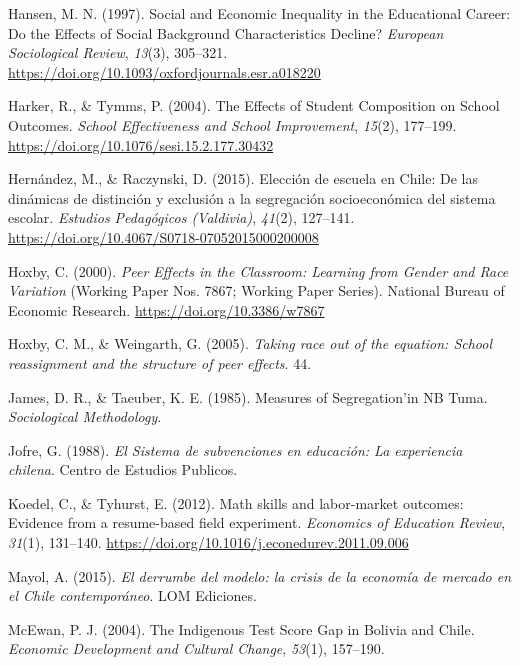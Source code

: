 \documentclass[
]{article}
\begin{document}
\leavevmode\hypertarget{ref-hansen_social_1997}{}%
Hansen, M. N. (1997). Social and Economic Inequality in the Educational
Career: Do the Effects of Social Background Characteristics Decline?
\emph{European Sociological Review}, \emph{13}(3), 305--321.
\url{https://doi.org/10.1093/oxfordjournals.esr.a018220}

\leavevmode\hypertarget{ref-harker_effects_2004}{}%
Harker, R., \& Tymms, P. (2004). The Effects of Student Composition on
School Outcomes. \emph{School Effectiveness and School Improvement},
\emph{15}(2), 177--199.
\url{https://doi.org/10.1076/sesi.15.2.177.30432}

\leavevmode\hypertarget{ref-hernandez_eleccion_2015}{}%
Hernández, M., \& Raczynski, D. (2015). Elección de escuela en Chile: De
las dinámicas de distinción y exclusión a la segregación socioeconómica
del sistema escolar. \emph{Estudios Pedagógicos (Valdivia)},
\emph{41}(2), 127--141.
\url{https://doi.org/10.4067/S0718-07052015000200008}

\leavevmode\hypertarget{ref-hoxby_peer_2000}{}%
Hoxby, C. (2000). \emph{Peer Effects in the Classroom: Learning from
Gender and Race Variation} (Working Paper Nos. 7867; Working Paper
Series). National Bureau of Economic Research.
\url{https://doi.org/10.3386/w7867}

\leavevmode\hypertarget{ref-hoxby_taking_2005}{}%
Hoxby, C. M., \& Weingarth, G. (2005). \emph{Taking race out of the
equation: School reassignment and the structure of peer effects}. 44.

\leavevmode\hypertarget{ref-james_measures_1985}{}%
James, D. R., \& Taeuber, K. E. (1985). Measures of Segregation'in NB
Tuma. \emph{Sociological Methodology}.

\leavevmode\hypertarget{ref-jofre1988sistema}{}%
Jofre, G. (1988). \emph{El Sistema de subvenciones en educación: La
experiencia chilena}. Centro de Estudios Publicos.

\leavevmode\hypertarget{ref-koedel_math_2012}{}%
Koedel, C., \& Tyhurst, E. (2012). Math skills and labor-market
outcomes: Evidence from a resume-based field experiment. \emph{Economics
of Education Review}, \emph{31}(1), 131--140.
\url{https://doi.org/10.1016/j.econedurev.2011.09.006}

\leavevmode\hypertarget{ref-mayol_derrumbe_2015}{}%
Mayol, A. (2015). \emph{El derrumbe del modelo: la crisis de la economía
de mercado en el Chile contemporáneo}. LOM Ediciones.

\leavevmode\hypertarget{ref-mcewan_indigenous_2004}{}%
McEwan, P. J. (2004). The Indigenous Test Score Gap in Bolivia and
Chile. \emph{Economic Development and Cultural Change}, \emph{53}(1),
157--190.
\end{document}

